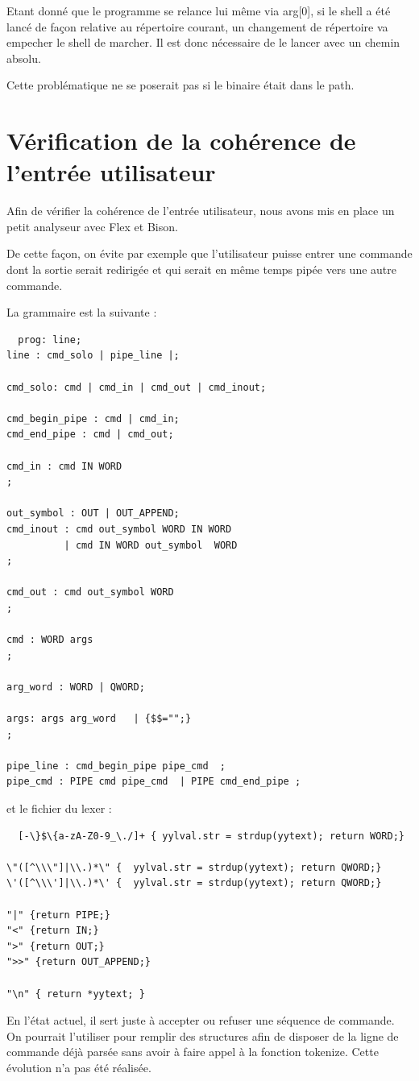 \documentclass[fr]{article}
\begin{document}
Etant donné que le programme se relance lui même via arg[0], si le
shell a été lancé de façon relative au répertoire courant, un
changement de répertoire va empecher le shell de marcher. Il est donc
nécessaire de le lancer avec un chemin absolu.

Cette problématique ne se poserait pas si le binaire était dans le path.

\section{Vérification de la cohérence de l'entrée utilisateur}

Afin de vérifier la cohérence de l'entrée utilisateur, nous avons mis
en place un petit analyseur avec Flex et Bison.

De cette façon, on évite par exemple que l'utilisateur puisse entrer une commande 
dont la sortie serait redirigée et qui serait en même temps pipée vers
une autre commande.

La grammaire est la suivante :
\begin{lstlisting}
  prog: line;
line : cmd_solo | pipe_line |;

cmd_solo: cmd | cmd_in | cmd_out | cmd_inout;

cmd_begin_pipe : cmd | cmd_in;
cmd_end_pipe : cmd | cmd_out;

cmd_in : cmd IN WORD 
;

out_symbol : OUT | OUT_APPEND;
cmd_inout : cmd out_symbol WORD IN WORD
          | cmd IN WORD out_symbol  WORD 
;

cmd_out : cmd out_symbol WORD 
;

cmd : WORD args 
;

arg_word : WORD | QWORD;

args: args arg_word   | {$$="";}
;

pipe_line : cmd_begin_pipe pipe_cmd  ;
pipe_cmd : PIPE cmd pipe_cmd  | PIPE cmd_end_pipe ;
\end{lstlisting}

et le fichier du lexer :

\begin{lstlisting}
  [-\}$\{a-zA-Z0-9_\./]+ { yylval.str = strdup(yytext); return WORD;}

\"([^\\\"]|\\.)*\" {  yylval.str = strdup(yytext); return QWORD;}
\'([^\\\']|\\.)*\' {  yylval.str = strdup(yytext); return QWORD;}

"|" {return PIPE;}
"<" {return IN;}
">" {return OUT;}
">>" {return OUT_APPEND;}

"\n" { return *yytext; } 
\end{lstlisting}
En l'état actuel, il sert juste à accepter ou refuser une séquence de
commande. On pourrait l'utiliser pour remplir des structures afin de 
disposer de la ligne de commande déjà parsée sans avoir à faire appel
à la fonction tokenize. Cette évolution n'a pas été réalisée.
\end{document}
